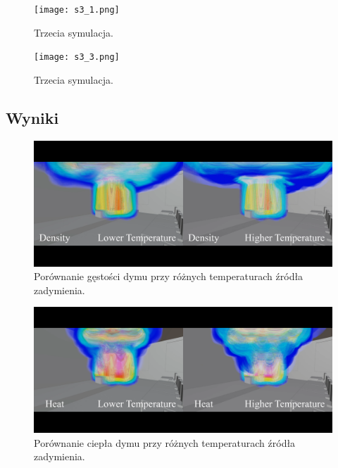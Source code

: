 \documentclass{article}
\begin{document}
	\vspace{7mm}
	\begin{figure}[ht!]
		\centering
		\texttt{[image: s3\_1.png]}
		\caption{Trzecia symulacja.}
		
		\vspace{15mm}
		\centering
		\texttt{[image: s3\_3.png]}
		\caption{Trzecia symulacja.}
	\end{figure}
	
	
	\newpage
	\subsection{Wyniki}
	
	\vspace{7mm}
	\begin{figure}[ht!]
		\centering
		\includegraphics[scale = 0.15]{1.png}
		\caption{Porównanie gęstości dymu przy różnych temperaturach źródła zadymienia.}
	\end{figure}
	
	\vspace{15mm}
	\begin{figure}[ht!]
		\centering
		\includegraphics[scale = 0.15]{2.png}
		\caption{Porównanie ciepła dymu przy różnych temperaturach źródła zadymienia.}
	\end{figure}
	
\end{document}
